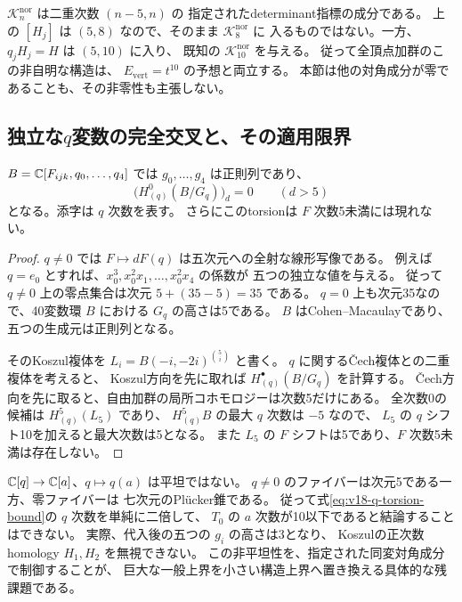 \begin{remark}[対角の同変成分との違い]
$\mathcal K_n^{\mathrm{nor}}$ は二重次数 $(n-5,n)$ の
指定されたdeterminant指標の成分である。
上の $[H_j]$ は $(5,8)$ なので、そのまま $\mathcal K_8^{\mathrm{nor}}$ に
入るものではない。一方、$q_jH_j=H$ は $(5,10)$ に入り、
既知の $\mathcal K_{10}^{\mathrm{nor}}$ を与える。
従って全頂点加群のこの非自明な構造は、
$E_{\mathrm{vert}}=t^{10}$ の予想と両立する。
本節は他の対角成分が零であることも、その非零性も主張しない。
\end{remark}

\subsection{独立な$q$変数の完全交叉と、その適用限界}

\begin{proposition}[代入前の普遍勾配は完全交叉である]
\label{prop:v18-universal-q-CI}
$B=\mathbb C[F_{ijk},q_0,\ldots,q_4]$ では $g_0,\ldots,g_4$ は正則列であり、
\begin{equation}\label{eq:v18-q-torsion-bound}
 \bigl(H^0_{(q)}(B/G_q)\bigr)_d=0\qquad(d>5)
\end{equation}
となる。添字は $q$ 次数を表す。
さらにこのtorsionは $F$ 次数5未満には現れない。
\end{proposition}

\begin{proof}
$q\ne0$ では $F\mapsto dF(q)$ は五次元への全射な線形写像である。
例えば $q=e_0$ とすれば、$x_0^3,x_0^2x_1,\ldots,x_0^2x_4$ の係数が
五つの独立な値を与える。
従って $q\ne0$ 上の零点集合は次元 $5+(35-5)=35$ である。
$q=0$ 上も次元35なので、40変数環 $B$ における $G_q$ の高さは5である。
$B$ はCohen--Macaulayであり、五つの生成元は正則列となる。

そのKoszul複体を $L_i=B(-i,-2i)^{\binom5i}$ と書く。
$q$ に関するČech複体との二重複体を考えると、
Koszul方向を先に取れば $H^\bullet_{(q)}(B/G_q)$ を計算する。
Čech方向を先に取ると、自由加群の局所コホモロジーは次数5だけにある。
全次数0の候補は $H^5_{(q)}(L_5)$ であり、
$H^5_{(q)}B$ の最大 $q$ 次数は $-5$ なので、
$L_5$ の $q$ シフト10を加えると最大次数は5となる。
また $L_5$ の $F$ シフトは5であり、$F$ 次数5未満は存在しない。
\end{proof}

\begin{remark}[非平坦な代入を越える際の未解決点]
$\mathbb C[q]\to\mathbb C[a]$、$q\mapsto q(a)$ は平坦ではない。
$q\ne0$ のファイバーは次元5である一方、零ファイバーは
七次元のPl\"ucker錐である。
従って式\eqref{eq:v18-q-torsion-bound}の $q$ 次数を単純に二倍して、
$T_0$ の $a$ 次数が10以下であると結論することはできない。
実際、代入後の五つの $g_i$ の高さは3となり、
Koszulの正次数homology $H_1,H_2$ を無視できない。
この非平坦性を、指定された同変対角成分で制御することが、
巨大な一般上界を小さい構造上界へ置き換える具体的な残課題である。
\end{remark}


